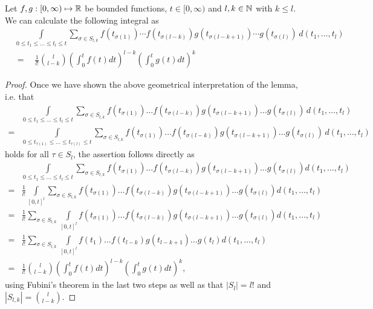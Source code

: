 \begin{Lemma} \label{ode:lem:sym}
Let $f,g: [0,\infty) \mapsto \mathbb{R}$ be bounded functions, $t \in [0,\infty)$ and
$l,k \in \mathbb{N}$ with $k \leq l$. We can calculate the following integral as
\begin{align*}
&\int\limits_{0 \leq t_1 \leq \ldots \leq t_l \leq t}
\sum_{\sigma \in S_{l,k}} 
	f(t_{\sigma(1)}) \cdots f(t_{\sigma(l-k)}) 
	g(t_{\sigma(l-k+1)}) \cdots g(t_{\sigma(l)})
	\, d(t_1,\ldots,t_l) \\
&= \quad \frac{1}{l!}\binom{l}{l-k} 	\left( \int_0^t f(t) dt \right)^{l-k} 
					\left( \int_0^t g(t) dt \right)^{k}
\end{align*}
\end{Lemma}
\begin{proof}
Once we have shown the above geometrical interpretation of the lemma, i.e. that
\small
\begin{equation} \label{ode:eq:permut}
\begin{aligned} 
&\int\limits_{0 \leq t_1 \leq \ldots \leq t_l \leq t}
\sum_{\sigma \in S_{l,k}} 
	f(t_{\sigma(1)}) \ldots f(t_{\sigma(l-k)}) 
	g(t_{\sigma(l-k+1)}) \ldots g(t_{\sigma(l)})
	\, d(t_1,\ldots,t_l) \\ 
= & \int\limits_{0 \leq t_{\tau(1)} \leq \ldots \leq t_{\tau(l)} \leq t}
	\sum_{\sigma \in S_{l,k}} 
	f(t_{\sigma(1)}) \ldots f(t_{\sigma(l-k)}) 
	g(t_{\sigma(l-k+1)}) \ldots g(t_{\sigma(l)})
	\, d(t_1,\ldots,t_l)
\end{aligned}
\end{equation}
\normalsize
holds for all $\tau \in S_l$, the assertion follows directly as 
\begin{align*}
&\int\limits_{0 \leq t_1 \leq \ldots \leq t_l \leq t}
\sum_{\sigma \in S_{l,k}} 
	f(t_{\sigma(1)}) \ldots f(t_{\sigma(l-k)}) 
	g(t_{\sigma(l-k+1)}) \ldots g(t_{\sigma(l)})
	d(t_1,\ldots,t_l) \\
= & \frac{1}{l!}\int\limits_{[0,t]^l}
\sum_{\sigma \in S_{l,k}} 
	f(t_{\sigma(1)}) \ldots f(t_{\sigma(l-k)}) 
	g(t_{\sigma(l-k+1)}) \ldots g(t_{\sigma(l)})
	d(t_1,\ldots,t_l) \\	
= &  \frac{1}{l!} \sum_{\sigma \in S_{l,k}} 
	\int\limits_{[0,t]^l}	
	f(t_{\sigma(1)}) \ldots f(t_{\sigma(l-k)}) 
	g(t_{\sigma(l-k+1)}) \ldots g(t_{\sigma(l)})
	d(t_1,\ldots,t_l) \\	
= &  \frac{1}{l!} \sum_{\sigma \in S_{l,k}} 
	\int\limits_{[0,t]^l}	
	f(t_{1}) \ldots f(t_{l-k}) 
	g(t_{l-k+1}) \ldots g(t_{l})
	d(t_1,\ldots,t_l) \\		
= & \frac{1}{l!}\binom{l}{l-k} 	\left( \int_0^t f(t) dt \right)^{l-k} 
				\left( \int_0^t g(t) dt \right)^{k},
\end{align*}
using Fubini's theorem in the last two steps as well as that $|S_l| = l!$ and $|S_{l,k}| =
\binom{l}{l-k}$.


\end{proof}

